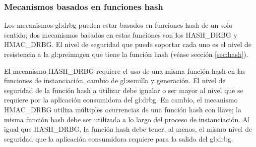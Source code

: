 %
%
\subsubsection{Mecanismos basados en funciones hash}

Los mecanismos \gls{gl:drbg} pueden estar basados en funciones hash de un
solo sentido; dos mecanismos basados en estas funciones son los HASH\_DRBG
y HMAC\_DRBG. El nivel de seguridad que puede soportar cada uno es el nivel de
resistencia a la \gls{gl:preimagen} que tiene la función hash (véase sección
\ref{sec:hash}).

El mecanismo HASH\_DRBG requiere el uso de una misma función hash en las
funciones de instanciación, cambio de \gls{gl:semilla} y generación. El nivel
de seguridad de la función hash a utilizar debe igualar o ser mayor al
nivel que se requiere por la aplicación consumidora del \gls{gl:drbg}. En
cambio, el mecanismo HMAC\_DRBG utiliza múltiples ocurrencias de una función
hash con llave; la misma función hash debe ser utilizada a lo largo del proceso
de instanciación. Al igual que HASH\_DRBG, la función hash debe tener, al menos,
el mismo nivel de seguridad que la aplicación consumidora requiere para la
salida del \gls{gl:drbg}.
